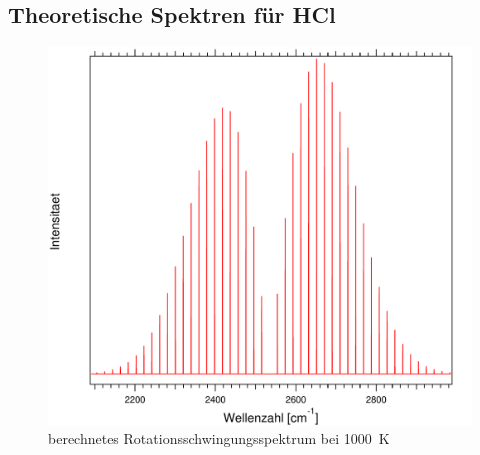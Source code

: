 \subsection*{Theoretische Spektren für HCl}

\begin{figure}[H]
\centering	
	\begin{minipage}{0.8\linewidth}
	\includegraphics[width=\linewidth]{Bilder/1000HCl.pdf}
	\caption{berechnetes Rotationsschwingungsspektrum bei 1000~K}
		\label{Rot:1000HCl}
	\end{minipage}

	
	
	

\end{figure}

